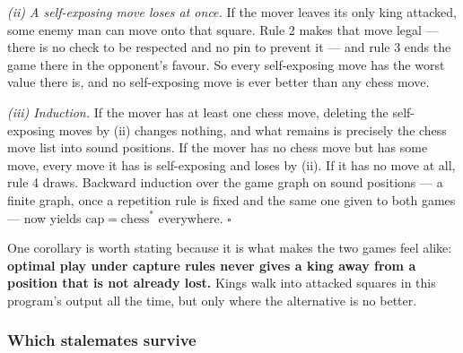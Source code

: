 \documentclass[11pt]{article}
\begin{document}
\emph{(ii) A self-exposing move loses at once.} If the mover leaves its only
king attacked, some enemy man can move onto that square. Rule 2 makes that move
legal --- there is no check to be respected and no pin to prevent it --- and
rule 3 ends the game there in the opponent's favour. So every self-exposing
move has the worst value there is, and no self-exposing move is ever better
than any chess move.

\emph{(iii) Induction.} If the mover has at least one chess move, deleting the
self-exposing moves by (ii) changes nothing, and what remains is precisely the
chess move list into sound positions. If the mover has no chess move but has
some move, every move it has is self-exposing and loses by (ii). If it has no
move at all, rule 4 draws. Backward induction over the game graph on sound
positions --- a finite graph, once a repetition rule is fixed and the same one
given to both games --- now yields $\mathrm{cap}=\mathrm{chess}^{\ast}$
everywhere.
\hfill$\square$

\smallskip
\noindent
One corollary is worth stating because it is what makes the two games feel
alike: \textbf{optimal play under capture rules never gives a king away from a
position that is not already lost.} Kings walk into attacked squares in this
program's output all the time, but only where the alternative is no better.

\subsubsection{Which stalemates survive}\label{sub:cap-stalemates}
\end{document}
